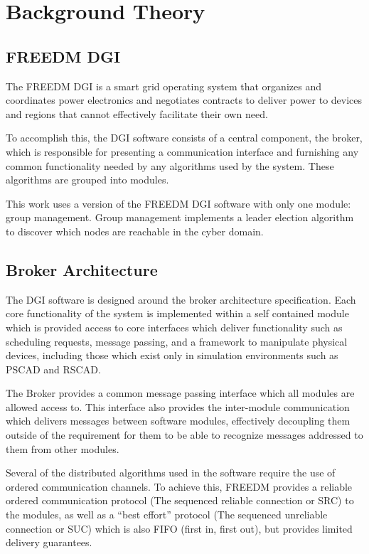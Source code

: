\section{Background Theory}
\subsection{FREEDM DGI}
The FREEDM DGI is a smart grid operating system that organizes and coordinates power electronics and negotiates contracts to deliver power to devices and regions that cannot effectively facilitate their own need.

To accomplish this, the DGI software consists of a central component, the broker, which is responsible for presenting a communication interface and furnishing any common functionality needed by any algorithms used by the system. These algorithms are grouped into modules.

This work uses a version of the FREEDM DGI software with only one module: group management. Group management implements a leader election algorithm to discover which nodes are reachable in the cyber domain.

\subsection{Broker Architecture}

The DGI software is designed around the broker architecture specification. Each core functionality of the system is implemented within a self contained module which is provided access to core interfaces which deliver functionality such as scheduling requests, message passing, and a framework to manipulate physical devices, including those which exist only in simulation environments such as PSCAD\cite{PSCAD} and RSCAD\cite{RSCAD}.

The Broker provides a common message passing interface which all modules are allowed access to. This interface also provides the inter-module communication which delivers messages between software modules, effectively decoupling them outside of the requirement for them to be able to recognize messages addressed to them from other modules.

Several of the distributed algorithms used in the software require the use of ordered communication channels. To achieve this, FREEDM provides a reliable ordered communication protocol (The sequenced reliable connection or SRC) to the modules, as well as a ``best effort'' protocol (The sequenced unreliable connection or SUC) which is also FIFO (first in, first out), but provides limited delivery guarantees.

